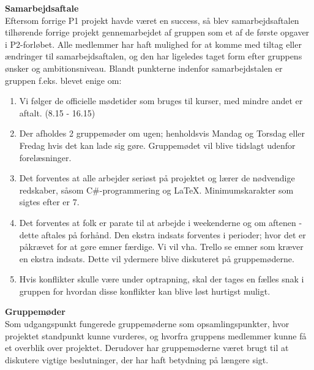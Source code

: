 \textbf{Samarbejdsaftale}\\ %
Eftersom forrige P1 projekt havde været en success, så blev samarbejdsaftalen tilhørende forrige projekt gennemarbejdet af gruppen som et af de første opgaver i P2-forløbet. Alle medlemmer har haft mulighed for at komme med tiltag eller ændringer til samarbejdsaftalen, og den har ligeledes taget form efter gruppens ønsker og ambitionsniveau. Blandt punkterne indenfor samarbejdstalen er gruppen f.eks. blevet enige om:
\begin{enumerate}
    \item Vi følger de officielle mødetider som bruges til kurser, med mindre andet er aftalt. (8.15 - 16.15)
    \item Der afholdes 2 gruppemøder om ugen; henholdsvis Mandag og Torsdag eller Fredag hvis det kan lade sig gøre. Gruppemødet vil blive tidslagt udenfor forelæsninger.
    \item Det forventes at alle arbejder seriøst på projektet og lærer de nødvendige redskaber, såsom C#-programmering og LaTeX. Minimumskarakter som sigtes efter er 7.
    \item Det forventes at folk er parate til at arbejde i weekenderne og om aftenen - dette aftales på forhånd. Den ekstra indsats forventes i perioder; hvor det er påkrævet for at gøre emner færdige. Vi vil vha. Trello se emner som kræver en ekstra indsats. Dette vil ydermere blive diskuteret på gruppemøderne. 
    \item Hvis konflikter skulle være under optrapning, skal der tages en fælles snak i gruppen for hvordan disse konflikter kan blive løst hurtigst muligt.
\end{enumerate}

\textbf{Gruppemøder}\\ %
Som udgangspunkt fungerede gruppemøderne som opsamlingspunkter, hvor projektet standpunkt kunne vurderes, og hvorfra gruppens medlemmer kunne få et overblik over projektet. Derudover har gruppemøderne været brugt til at diskutere vigtige beslutninger, der har haft betydning på længere sigt.
